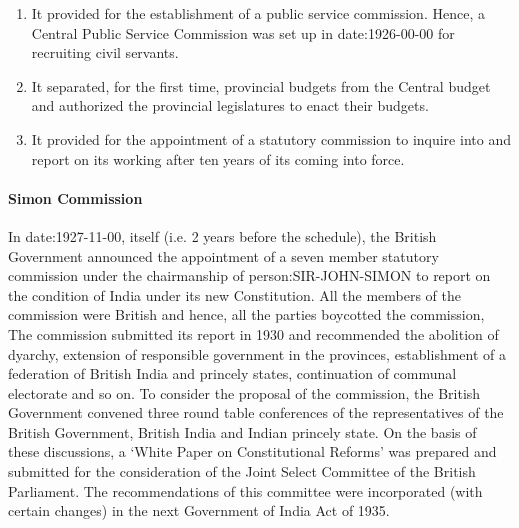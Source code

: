 \begin{enumerate}
  \item It provided for the establishment of a public service commission. Hence, a Central Public Service Commission was set up in \gls{date:1926-00-00} for recruiting civil servants.
  \item It separated, for the first time, provincial budgets from the Central budget and authorized the provincial legislatures to enact their budgets.
  \item It provided for the appointment of a statutory commission to inquire into and report on its working after ten years of its coming into force.
\end{enumerate}

\paragraph{Simon Commission}

In \gls{date:1927-11-00}, itself (i.e. 2 years before the schedule), the British Government announced the appointment of a seven member statutory commission under the chairmanship of \gls{person:SIR-JOHN-SIMON} to report on the condition of India under its new Constitution. All the members of the commission were British and hence, all the parties boycotted the commission, The commission submitted its report in 1930 and recommended the abolition of dyarchy, extension of responsible government in the provinces, establishment of a federation of British India and princely states, continuation of communal electorate and so on. To consider the proposal of the commission, the British Government convened three round table conferences of the representatives of the British Government, British India and Indian princely state. On the basis of these discussions, a `White Paper on Constitutional Reforms' was prepared and submitted for the consideration of the Joint Select Committee of the British Parliament. The recommendations of this committee were incorporated (with certain changes) in the next Government of India Act of 1935.

